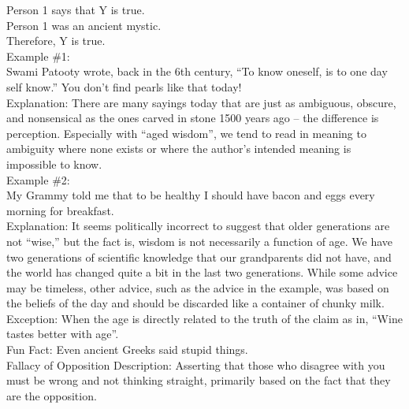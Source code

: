 \documentclass[a4paper,12pt,single,pdftex]{scrbook}
\begin{document}
    
      Person 1 says that Y is true. 
    \\

    
      Person 1 was an ancient mystic.
    \\

    
      Therefore, Y is true.
    \\

    
      Example \#1:
    \\

    
      Swami Patooty wrote, back in the 6th century, “To know oneself, is to one day self know.”  You don’t find pearls like that today!
    \\

    
      Explanation: There are many sayings today that are just as ambiguous, obscure, and nonsensical as the ones carved in stone 1500 years ago -- the difference is perception.  Especially with “aged wisdom”, we tend to read in meaning to ambiguity where none exists or where the author’s intended meaning is impossible to know.
    \\

    
      Example \#2:
    \\

    
      My Grammy told me that to be healthy I should have bacon and eggs every morning for breakfast.
    \\

    
      Explanation: It seems politically incorrect to suggest that older generations are not “wise,” but the fact is, wisdom is not necessarily a function of age.  We have two generations of scientific knowledge that our grandparents did not have, and the world has changed quite a bit in the last two generations.  While some advice may be timeless, other advice, such as the advice in the example, was based on the beliefs of the day and should be discarded like a container of chunky milk.
    \\

    
      Exception: When the age is directly related to the truth of the claim as in, “Wine tastes better with age”.
    \\

    
      Fun Fact: Even ancient Greeks said stupid things.
    \\

  

Fallacy of Opposition
    Description: Asserting that those who disagree with you must be wrong and not thinking straight, primarily based on the fact that they are the opposition.
\end{document}
